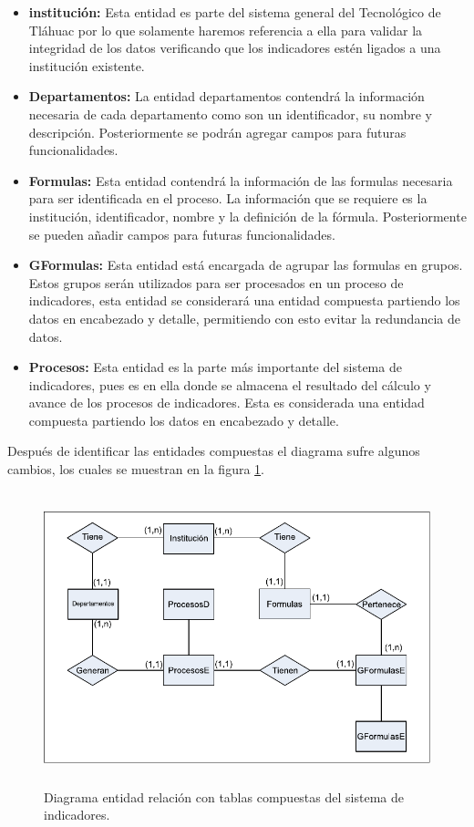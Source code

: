 		    \begin{itemize}
		    	\item \textbf{instituci\'on:} Esta entidad es parte del sistema general del Tecnol\'ogico de Tl\'ahuac por lo que solamente haremos referencia a ella para validar la integridad de los datos verificando que los indicadores est\'en ligados a una instituci\'on existente.
		    	\item \textbf{Departamentos:} La entidad departamentos contendr\'a la informaci\'on necesaria de cada departamento como son un identificador, su nombre y descripci\'on. Posteriormente se podr\'an agregar campos para futuras funcionalidades.
		    	\item \textbf{Formulas:} Esta entidad contendr\'a la informaci\'on de las formulas necesaria para ser identificada en el proceso. La informaci\'on que se requiere es la instituci\'on, identificador, nombre y la definici\'on de la f\'ormula. Posteriormente se pueden a\~nadir campos para futuras funcionalidades.
		    	\item \textbf{GFormulas:} Esta entidad est\'a encargada de agrupar las formulas en grupos. Estos grupos ser\'an utilizados para ser procesados en un proceso de indicadores, esta entidad se considerar\'a una entidad compuesta partiendo los datos en encabezado y detalle, permitiendo con esto evitar la redundancia de datos.
		    	\item \textbf{Procesos:} Esta entidad es la parte m\'as importante del sistema de indicadores, pues es en ella donde se almacena el resultado del c\'alculo y avance de los procesos de indicadores. Esta es considerada una entidad compuesta partiendo los datos en encabezado y detalle.
		    \end{itemize}

		    Despu\'es de identificar las entidades compuestas el diagrama sufre algunos cambios, los cuales se muestran en la figura \ref{fig_DEntidadRelComp}.

		    \begin{figure}[H]
		        \centering
		        \includegraphics[width=16cm, height=8.5cm]{figuras/DEntidadRelComp}
		        \caption{Diagrama entidad relaci\'on con tablas compuestas del sistema de indicadores.}
		        \label{fig_DEntidadRelComp}
		    \end{figure}

